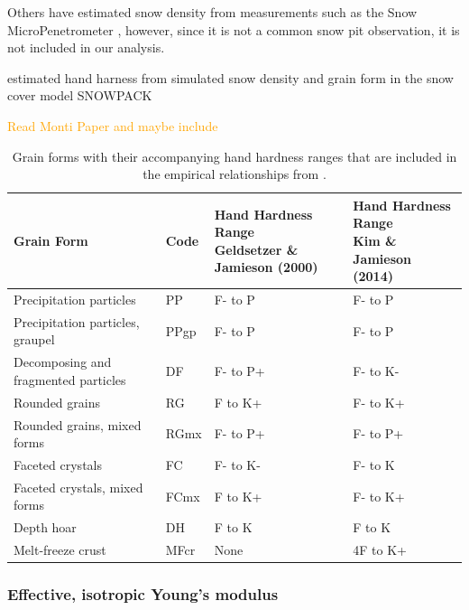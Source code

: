 \documentclass[journal abbreviation, manuscript]{copernicus}
\begin{document}
Others have estimated snow density from measurements such as the Snow MicroPenetrometer \citep{king2020}, however, since it is not a common snow pit observation, it is not included in our analysis.

\citet{monti2014} estimated hand harness from simulated snow density and grain form in the snow cover model SNOWPACK 

\textcolor{orange}{Read Monti \citep{monti2014} Paper and maybe include}




\FloatBarrier

\begin{table}[]
\caption{Grain forms with their accompanying hand hardness ranges that are included in the empirical relationships from \citet{geldsetzer2000}.}
\label{tab:geldesetzer}
\begin{tabular}{l|l|l|l}
Grain Form & Code & 
\makecell{Hand Hardness Range\\Geldsetzer \& Jamieson (2000)} &
\makecell{Hand Hardness Range\\Kim \& Jamieson (2014)} \\ \hline
Precipitation particles               & PP   & F- to P                    &F- to P\\
Precipitation particles, graupel      & PPgp & F- to P                    &F- to P\\
Decomposing and fragmented particles  & DF   & F- to P+                   &F- to K-\\
Rounded grains                        & RG   & F to K+                    &F- to K+\\
Rounded grains, mixed forms           & RGmx & F- to P+                   &F- to P+\\
Faceted crystals                      & FC   & F- to K-                   &F- to K\\
Faceted crystals, mixed forms         & FCmx & F to K+                    &F- to K+\\
Depth hoar                            & DH   & F to K                      &F to K\\
Melt-freeze crust                     & MFcr & None                         &4F to K+\\
\end{tabular}
\end{table}


\FloatBarrier


\subsubsection{Effective, isotropic Young's modulus}
\end{document}
